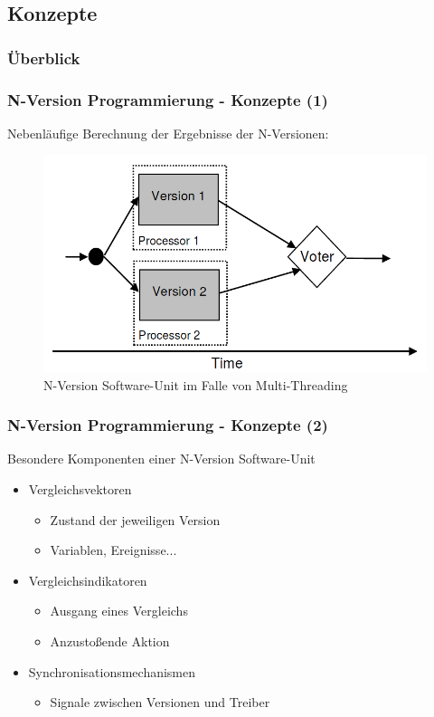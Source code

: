 \subsection{Konzepte}
%
%
\begin{frame}
	\frametitle{Überblick}
	\tableofcontents[currentsubsection]
\end{frame}
%
%
\begin{frame}
	\frametitle{N-Version Programmierung - Konzepte (1)}
	Nebenläufige Berechnung der Ergebnisse der N-Versionen:
	\begin{figure}
		\includegraphics[scale=0.3]{grafiken/multi-thread-n-version.png}		
		\caption{N-Version Software-Unit im Falle von Multi-Threading
			\footnotemark		
		}		
	\end{figure}
\end{frame}
%
%
\begin{frame}
	\frametitle{N-Version Programmierung - Konzepte (2)}
	Besondere Komponenten einer N-Version Software-Unit
	\begin{itemize}
		\item Vergleichsvektoren
		\begin{itemize}
			\item Zustand der jeweiligen Version
			\item Variablen, Ereignisse...
		\end{itemize}
		\pause
		\item Vergleichsindikatoren
		\begin{itemize}
			\item Ausgang eines Vergleichs
			\item Anzustoßende Aktion
		\end{itemize}
		\pause
		\item Synchronisationsmechanismen
		\begin{itemize}
			\item Signale zwischen Versionen und Treiber
		\end{itemize}
	\end{itemize}
\end{frame}
